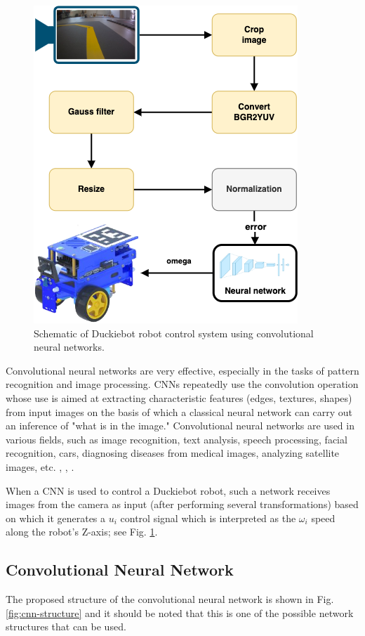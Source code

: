 \documentclass[conference]{IEEEtran}
\begin{document}
\begin{figure}[h]
    \centering
    \includegraphics[width=.8\columnwidth]{NNPipeline3}
    \caption{Schematic of Duckiebot robot control system using convolutional neural networks.}
    \label{fig:cnn-pipeline}
\end{figure}

Convolutional neural networks are very effective, especially in the tasks of pattern recognition and image processing. CNNs repeatedly use the convolution operation whose use is aimed at extracting characteristic features (edges, textures, shapes) from input images on the basis of which a classical neural network can carry out an inference of "what is in the image." Convolutional neural networks are used in various fields, such as image recognition, text analysis, speech processing, facial recognition, cars, diagnosing diseases from medical images, analyzing satellite images, etc. \cite{li2021survey}, \cite{rawat2017deep}, \cite{almasi2020robust}.

When a CNN is used to control a Duckiebot robot, such a network receives images from the camera as input (after performing several transformations) based on which it generates a $u_i$ control signal which is interpreted as the $\omega_i$ speed along the robot's Z-axis; see Fig. \ref{fig:cnn-pipeline}.

\subsection{Convolutional Neural Network}
The proposed structure of the convolutional neural network is shown in Fig. \ref{fig:cnn-structure} and it should be noted that this is one of the possible network structures that can be used.
\end{document}
